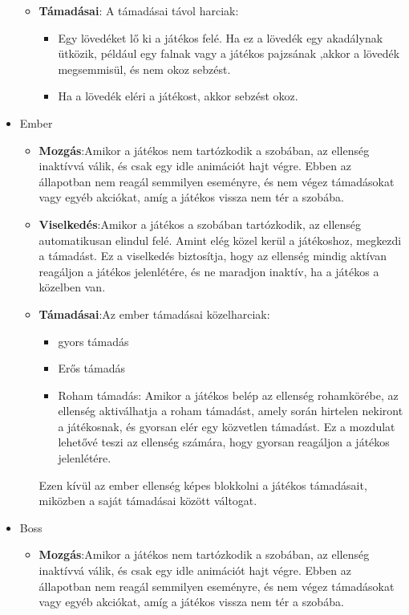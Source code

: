 \documentclass[
]{thesis-ekf}
\theoremstyle{definition}
\theoremstyle{remark}
\begin{document}
\begin{itemize}
\begin{itemize}
\begin{itemize}
		\end{itemize}
		\item \textbf{Támadásai}: A támadásai távol harciak:
		\begin{itemize}
			\item Egy lövedéket lő ki a játékos felé. Ha ez a lövedék egy akadálynak ütközik, például egy falnak vagy a játékos pajzsának ,akkor a lövedék megsemmisül, és nem okoz sebzést.
			\item Ha a lövedék eléri a játékost, akkor sebzést okoz.
		\end{itemize}
		
	\end{itemize}
	\item Ember
	\begin{itemize}
		\item \textbf{Mozgás}:Amikor a játékos nem tartózkodik a szobában, az ellenség inaktívvá válik, és csak egy idle animációt hajt végre. Ebben az állapotban nem reagál semmilyen eseményre, és nem végez támadásokat vagy egyéb akciókat, amíg a játékos vissza nem tér a szobába.
		\item \textbf{Viselkedés}:Amikor a játékos a szobában tartózkodik, az ellenség automatikusan elindul felé. Amint elég közel kerül a játékoshoz, megkezdi a támadást. Ez a viselkedés biztosítja, hogy az ellenség mindig aktívan reagáljon a játékos jelenlétére, és ne maradjon inaktív, ha a játékos a közelben van.
		\item \textbf{Támadásai}:Az ember támadásai közelharciak:
		\begin{itemize}
			\item gyors támadás
			\item Erős támadás
			\item Roham támadás: Amikor a játékos belép az ellenség rohamkörébe, az ellenség aktiválhatja a roham támadást, amely során hirtelen nekiront a játékosnak, és gyorsan elér egy közvetlen támadást. Ez a mozdulat lehetővé teszi az ellenség számára, hogy gyorsan reagáljon a játékos jelenlétére.
		\end{itemize}
		Ezen kívül az ember ellenség képes blokkolni a játékos támadásait, miközben a saját támadásai között váltogat.
	\end{itemize}
	\item Boss
	\begin{itemize}
		\item \textbf{Mozgás}:Amikor a játékos nem tartózkodik a szobában, az ellenség inaktívvá válik, és csak egy idle animációt hajt végre. Ebben az állapotban nem reagál semmilyen eseményre, és nem végez támadásokat vagy egyéb akciókat, amíg a játékos vissza nem tér a szobába.

\end{itemize}
\end{itemize}
\end{document}
